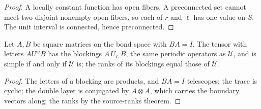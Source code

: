 \begin{proof}\leanok
    A locally constant function has open fibers. A preconnected set cannot meet
    two disjoint nonempty open fibers, so each of $r$ and $\ell$ has one value
    on $S$. The unit interval is connected, hence preconnected.
\end{proof}

\begin{lemma}
    \label{thm:mpu_virtual_sandwich_blocking}
    \leanok
    Let $A,B$ be square matrices on the bond space with $BA=I$. The tensor with
    letters $AU^{ij}B$ has the blockings $A\,U_L\,B$, the same periodic
    operators as $\mathcal U$, and is simple if and only if $\mathcal U$ is;
    the ranks of its blockings equal those of $\mathcal U$.
\end{lemma}

\begin{proof}\leanok
    The letters of a blocking are products, and $BA=I$ telescopes; the trace is
    cyclic; the double layer is conjugated by $\bar A\otimes A$, which carries
    the boundary vectors along; the ranks by the source-ranks theorem.
\end{proof}

